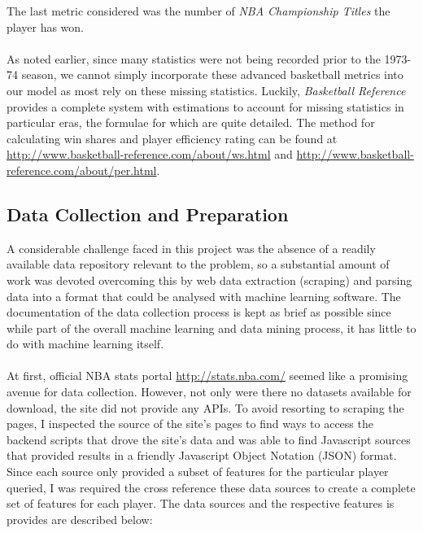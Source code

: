 \documentclass[paper=a4, fontsize=11pt]{scrartcl} %
\numberwithin{equation}{section} %
\numberwithin{figure}{section} %
\numberwithin{table}{section} %
\begin{document}
The last metric considered was the number of \textit{NBA Championship Titles} the player has won.\\
\\
As noted earlier, since many statistics were not being recorded prior to the 1973-74 season, we cannot simply incorporate these advanced basketball metrics into our model as most rely on these missing statistics. Luckily, \textit{Basketball Reference} provides a complete system with estimations to account for 	missing statistics in particular eras, the formulae for which are quite detailed. The method for calculating win shares and player efficiency rating can be found at \url{http://www.basketball-reference.com/about/ws.html} and \url{http://www.basketball-reference.com/about/per.html}.\\

\subsection{Data Collection and Preparation}

A considerable challenge faced in this project was the absence of a readily available data repository relevant to the problem, so a substantial amount of work was devoted overcoming this by web data extraction (scraping) and parsing data into a format that could be analysed with machine learning software. The documentation of the data collection process is kept as brief as possible since while part of the overall machine learning and data mining process, it has little to do with machine learning itself.\\
\\
At first, official NBA stats portal \url{http://stats.nba.com/} seemed like a promising avenue for data collection. However, not only were there no datasets available for download, the site did not provide any APIs. To avoid resorting to scraping the pages, I inspected the source of the site's pages to find ways to access the backend scripts that drove the site's data and was able to find Javascript sources that provided results in a friendly Javascript Object Notation (JSON) format. Since each source only provided a subset of features for the particular player queried, I was required the cross reference these data sources to create a complete set of features for each player. The data sources and the respective features is provides are described below:
\end{document}
